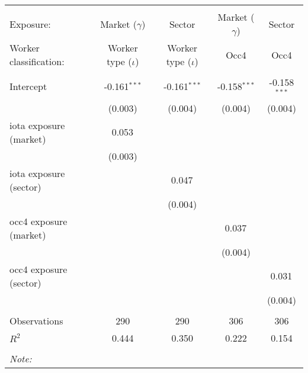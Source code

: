 \begin{tabular}{@{\extracolsep{5pt}}lcccc}
\\[-1.8ex]\hline
\hline \\[-1.8ex]
\hline \\[-1.8ex]
 Exposure: & Market ($\gamma$) & Sector & Market ($\gamma$) & Sector \\
 Worker classification: & Worker type ($\iota$) & Worker type ($\iota$) & Occ4 & Occ4 \\
 \hline &  &  &  &  \\
 Intercept & -0.161$^{***}$ & -0.161$^{***}$ & -0.158$^{***}$ & -0.158$^{***}$ \\
  & (0.003) & (0.004) & (0.004) & (0.004) \\
 iota exposure (market) & 0.053$^{}$ & & & \\
  & (0.003) & & & \\
 iota exposure (sector) & & 0.047$^{}$ & & \\
  & & (0.004) & & \\
 occ4 exposure (market) & & & 0.037$^{}$ & \\
  & & & (0.004) & \\
 occ4 exposure (sector) & & & & 0.031$^{}$ \\
  & & & & (0.004) \\
\hline \\[-1.8ex]
 Observations & 290 & 290 & 306 & 306 \\
 $R^2$ & 0.444 & 0.350 & 0.222 & 0.154 \\
\hline
\hline \\[-1.8ex]
\textit{Note:}\end{tabular}